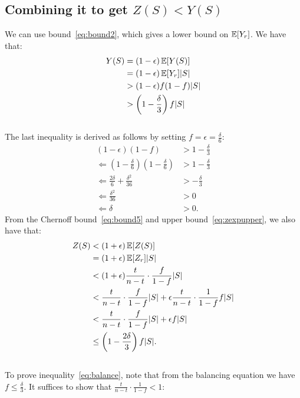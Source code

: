 
\subsection{Combining it to get $Z(S) < Y(S)$}
We can use bound~\ref{eq:bound2}, which gives a lower bound on $\mathbb{E}[Y_r]$.
We have that:
\begin{align}
Y(S) & = (1-\epsilon)\operatorname{\mathbb{E}}[Y(S)] \\
& = (1-\epsilon)\operatorname{\mathbb{E}}[Y_r] |S| \\
&> (1-\epsilon)f(1-f)|S|\\
&>  \left(1 - \frac{\delta}{3}\right)f|S| \label{eq:ylower}
\end{align}\\
The last inequality is derived as follows by setting $f = \epsilon = \frac{\delta}{6}$:
\begin{align}
 (1-\epsilon)(1-f) &> 1 - \frac{\delta}{3}\\
 \Leftarrow \left(1-\frac{\delta}{6}\right)\left(1-\frac{\delta}{6}\right) &> 1-\frac{\delta}{3}\\
 \Leftarrow \frac{2\delta}{6} + \frac{\delta^2}{36} &> -\frac{\delta}{3}\\
 \Leftarrow \frac{\delta^2}{36} &> 0\\
 \Leftarrow \delta &> 0.
\end{align}
From the Chernoff bound~\ref{eq:bound5} and upper bound~\ref{eq:zexpupper}, we also have that:
\begin{align}
Z(S) &< (1+\epsilon)\operatorname{\mathbb{E}}[Z(S)]\\
&=(1+\epsilon)\operatorname{\mathbb{E}}[Z_r]|S|\\
&<(1+\epsilon)\frac{t}{n-t} \cdot \frac{f}{1-f} |S|\\
&<\frac{t}{n-t} \cdot \frac{f}{1-f} |S|+\epsilon\frac{t}{n-t} \cdot \frac{1}{1-f} f|S|\\
&< \frac{t}{n-t} \cdot \frac{f}{1-f} |S| + \epsilon f|S|\label{eq:balance}\\
&\leq \left(1 - \frac{2\delta}{3}\right)f|S|\label{eq:zupper}.
\end{align}\\
To prove inequality~\ref{eq:balance}, note that from the balancing equation we have $f \leq \frac{\delta}{3}$. It suffices to show that $\frac{t}{n-t}\cdot\frac{1}{1-f} < 1$:
